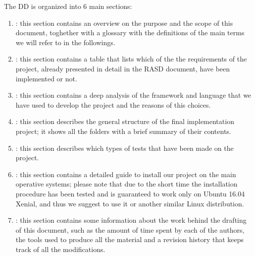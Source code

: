 The DD is organized into 6 main sections:

\begin{enumerate}
\item {\textbf{}}: this section contains an overview on the purpose and the scope of this document, toghether with a glossary with the definitions of the main terms we will refer to in the followings.
\item {\textbf{}}: this section contains a table that lists which of the the requirements of the project, already presented in detail in the RASD document, have been implemented or not.
\item {\textbf{}}: this section contains a deep analysis of the framework and language that we have used to develop the project and the reasons of this choices.
\item {\textbf{}}: this section describes the general structure of the final implementation project; it shows all the folders with a brief summary of their contents.
\item {\textbf{}}: this section describes which types of tests that have been made on the project.
\item {\textbf{}}: this section contains a detailed guide to install our project on the main operative systems; please note that due to the short time the installation procedure has been tested and is guaranteed to work only on Ubuntu 16.04 Xenial, and thus we suggest to use it or another similar Linux distribution.
\item {\textbf{}}: this section contains some information about the work behind the drafting of this
document, such as the amount of time spent by each of the authors, the tools used to produce all
the material and a revision history that keeps track of all the modifications.
\end{enumerate}
